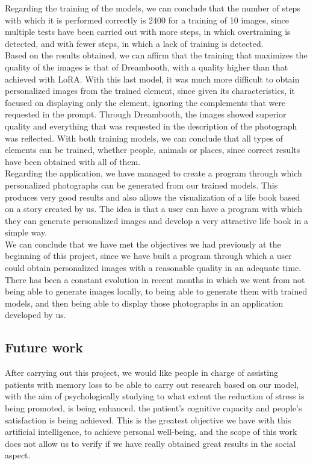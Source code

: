 Regarding the training of the models, we can conclude that the number of steps with which it is performed correctly is 2400 for a training of 10 images, since multiple tests have been carried out with more steps, in which overtraining is detected, and with fewer steps, in which a lack of training is detected.\\

Based on the results obtained, we can affirm that the training that maximizes the quality of the images is that of Dreambooth, with a quality higher than that achieved with LoRA. With this last model, it was much more difficult to obtain personalized images from the trained element, since given its characteristics, it focused on displaying only the element, ignoring the complements that were requested in the prompt. Through Dreambooth, the images showed superior quality and everything that was requested in the description of the photograph was reflected. With both training models, we can conclude that all types of elements can be trained, whether people, animals or places, since correct results have been obtained with all of them.\\

Regarding the application, we have managed to create a program through which personalized photographs can be generated from our trained models. This produces very good results and also allows the visualization of a life book based on a story created by us. The idea is that a user can have a program with which they can generate personalized images and develop a very attractive life book in a simple way.\\

We can conclude that we have met the objectives we had previously at the beginning of this project, since we have built a program through which a user could obtain personalized images with a reasonable quality in an adequate time. There has been a constant evolution in recent months in which we went from not being able to generate images locally, to being able to generate them with trained models, and then being able to display those photographs in an application developed by us.\\

\subsection{Future work}

After carrying out this project, we would like people in charge of assisting patients with memory loss to be able to carry out research based on our model, with the aim of psychologically studying to what extent the reduction of stress is being promoted, is being enhanced. the patient's cognitive capacity and people's satisfaction is being achieved. This is the greatest objective we have with this artificial intelligence, to achieve personal well-being, and the scope of this work does not allow us to verify if we have really obtained great results in the social aspect.\\

